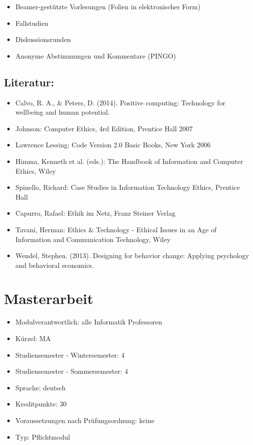 \begin{itemize}
\item
  Beamer-gestützte Vorlesungen (Folien in elektronischer Form)
\item
  Fallstudien
\item
  Diskussionsrunden
\item
  Anonyme Abstimmungen und Kommentare (PINGO)
\end{itemize}

\section*{Literatur:}\label{literatur}

\begin{itemize}
\item
  Calvo, R. A., \& Peters, D. (2014). Positive computing: Technology for
  wellbeing and human potential.
\item
  Johnson: Computer Ethics, 4rd Edition, Prentice Hall 2007
\item
  Lawrence Lessing: Code Version 2.0 Basic Books, New York 2006
\item
  Himma, Kenneth et al. (eds.): The Handbook of Information and Computer
  Ethics, Wiley
\item
  Spinello, Richard: Case Studies in Information Technology Ethics,
  Prentice Hall
\item
  Capurro, Rafael: Ethik im Netz, Franz Steiner Verlag
\item
  Tavani, Herman: Ethics \& Technology - Ethical Issues in an Age of
  Information and Communication Technology, Wiley
\item
  Wendel, Stephen. (2013). Designing for behavior change: Applying
  psychology and behavioral economics.
\end{itemize}

\chapter{Masterarbeit}\label{masterarbeit}

\begin{itemize}
\tightlist
\item
  Modulverantwortlich: alle Informatik Professoren
\item
  Kürzel: MA
\item
  Studiensemester - Wintersemester: 4
\item
  Studiensemester - Sommersemester: 4
\item
  Sprache: deutsch
\item
  Kreditpunkte: 30
\item
  Voraussetzungen nach Prüfungsordnung: keine
\item
  Typ: Pflichtmodul
\end{itemize}

